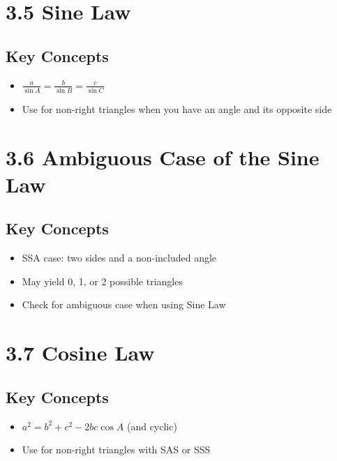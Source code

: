 \documentclass[12pt]{article}
\begin{document}
\section{3.5 Sine Law}
\subsection*{Key Concepts}
\begin{tcolorbox}[colback=lightgray,colframe=primary,title=Sine Law]
    \begin{itemize}
        \item $\frac{a}{\sin A} = \frac{b}{\sin B} = \frac{c}{\sin C}$
        \item Use for non-right triangles when you have an angle and its opposite side
    \end{itemize}
\end{tcolorbox}

\section{3.6 Ambiguous Case of the Sine Law}
\subsection*{Key Concepts}
\begin{tcolorbox}[colback=lightgray,colframe=primary,title=Ambiguous Case (SSA)]
    \begin{itemize}
        \item SSA case: two sides and a non-included angle
        \item May yield 0, 1, or 2 possible triangles
        \item Check for ambiguous case when using Sine Law
    \end{itemize}
\end{tcolorbox}

\section{3.7 Cosine Law}
\subsection*{Key Concepts}
\begin{tcolorbox}[colback=lightgray,colframe=primary,title=Cosine Law]
    \begin{itemize}
        \item $a^2 = b^2 + c^2 - 2bc\cos A$ (and cyclic)
        \item Use for non-right triangles with SAS or SSS
    \end{itemize}
\end{tcolorbox}
\end{document}
